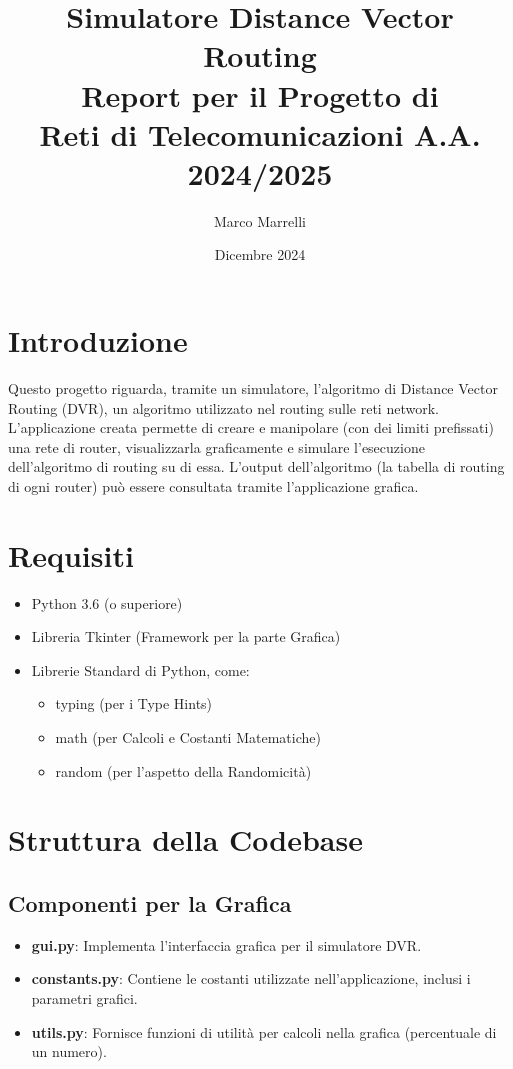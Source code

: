 \documentclass[a4paper,12pt]{report}
\title{Simulatore Distance Vector Routing\\Report per il Progetto di\\Reti di Telecomunicazioni A.A. 2024/2025}
\author{Marco Marrelli}
\date{Dicembre 2024}
\begin{document}
\maketitle

\renewcommand{\contentsname}{Indice}
\tableofcontents{}

\newpage
\section{Introduzione}
Questo progetto riguarda, tramite un simulatore, l'algoritmo di Distance Vector Routing (DVR), un algoritmo utilizzato nel routing sulle reti network.
L'applicazione creata permette di creare e manipolare (con dei limiti prefissati) una rete di router, visualizzarla graficamente e simulare l'esecuzione dell'algoritmo di routing su di essa.
L'output dell'algoritmo (la tabella di routing di ogni router) può essere consultata tramite l'applicazione grafica.

\section{Requisiti}
\begin{itemize}
    \item Python 3.6 (o superiore)
    \item Libreria Tkinter (Framework per la parte Grafica)
    \item Librerie Standard di Python, come:
    \begin{itemize}
        \item typing (per i Type Hints)
        \item math (per Calcoli e Costanti Matematiche)
        \item random (per l'aspetto della Randomicità)
    \end{itemize}
\end{itemize}

\newpage
\section{Struttura della Codebase}
\subsection{Componenti per la Grafica}
\begin{itemize}
    \item \textbf{gui.py}: Implementa l'interfaccia grafica per il simulatore DVR.
    \item \textbf{constants.py}: Contiene le costanti utilizzate nell'applicazione, inclusi i parametri grafici.
    \item \textbf{utils.py}: Fornisce funzioni di utilità per calcoli nella grafica (percentuale di un numero).
\end{itemize}
\end{document}
